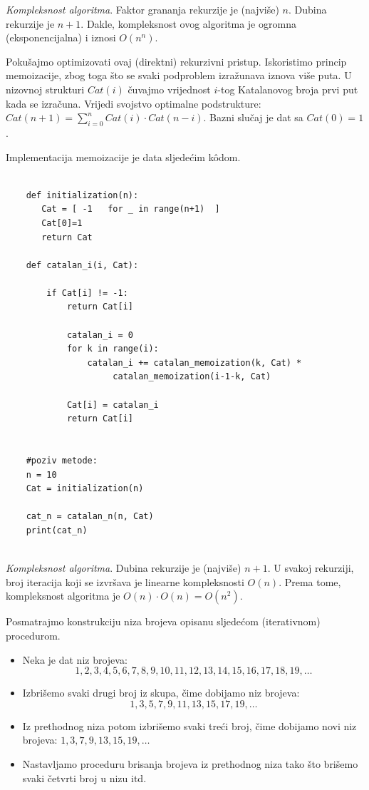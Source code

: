   \emph{Kompleksnost algoritma}. Faktor grananja rekurzije je (najviše) $n$. Dubina rekurzije je $n+1$. Dakle, kompleksnost ovog algoritma je ogromna (eksponencijalna) i iznosi $O(n^n)$. 

Pokušajmo optimizovati ovaj (direktni) rekurzivni pristup. Iskoristimo princip memoizacije, zbog toga što se svaki podproblem izražunava iznova više puta. U nizovnoj strukturi $Cat(i)$ čuvajmo vrijednost $i$-tog Katalanovog broja prvi put kada se izračuna.  Vrijedi svojstvo optimalne podstrukture: $Cat(n+1) = \sum_{i=0}^{n} Cat(i) \cdot Cat(n-i).$ Bazni slučaj je dat sa $Cat(0) =1$.

Implementacija memoizacije je data sljedećim k\^odom.

  \begin{verbatim}
	
	def initialization(n):
	   Cat = [ -1   for _ in range(n+1)  ] 
	   Cat[0]=1
	   return Cat 
	
	def catalan_i(i, Cat): 
	
	    if Cat[i] != -1:
	        return Cat[i]
     
            catalan_i = 0
            for k in range(i): 
                catalan_i += catalan_memoization(k, Cat) *
                     catalan_memoization(i-1-k, Cat)
    
            Cat[i] = catalan_i
            return Cat[i]
    
	   
	#poziv metode:
	n = 10
	Cat = initialization(n) 
	
	cat_n = catalan_n(n, Cat) 
	print(cat_n)
	
\end{verbatim}  

\emph{Kompleksnost algoritma}. Dubina rekurzije je (najviše) $n+1$. U svakoj rekurziji, broj iteracija koji se izvršava je linearne kompleksnosti $O(n)$. Prema tome, kompleksnost algoritma je $O(n) \cdot O(n) = O(n^2)$. 


 
 Posmatrajmo konstrukciju niza brojeva opisanu sljedećom (iterativnom) procedurom.
 
 \begin{itemize}
 	\item Neka je dat niz brojeva:
 	$$1, 2, 3, 4, 5, 6, 7, 8, 9, 10, 11, 12, 13, 14, 15, 16, 17, 18, 19,\ldots $$
 	\item Izbrišemo svaki drugi broj iz skupa, čime dobijamo niz brojeva:
 	$$1, 3, 5, 7, 9, 11, 13, 15, 17, 19,\ldots$$
 	\item Iz prethodnog niza potom izbrišemo svaki treći broj, čime dobijamo novi niz brojeva: $1, 3, 7, 9, 13, 15, 19,\ldots$
 	\item Nastavljamo proceduru brisanja brojeva iz prethodnog niza tako što brišemo svaki četvrti broj u nizu itd.
 \end{itemize} 
 
